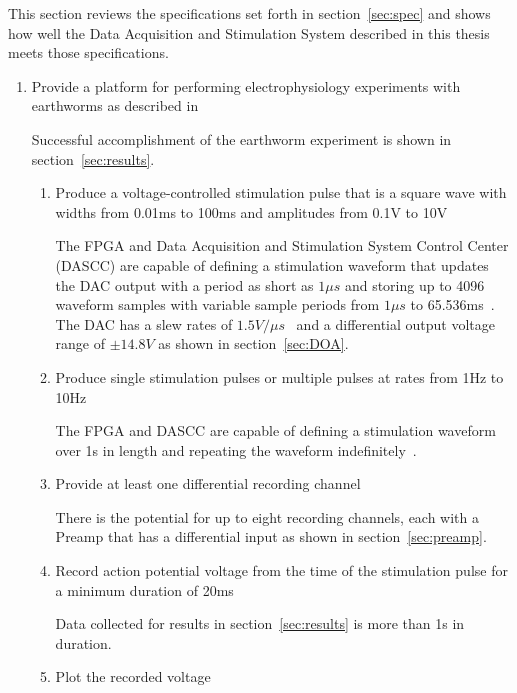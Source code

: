 This section reviews the specifications set forth in section~\ref{sec:spec} and shows how well the Data Acquisition and Stimulation System described in this thesis meets those specifications.

\begin{enumerate}

\item Provide a platform for performing electrophysiology experiments with earthworms as described in~\cite{Olivo,KuehJellies}

Successful accomplishment of the earthworm experiment is shown in section~\ref{sec:results}.

	\begin{enumerate}
	
	\item Produce a voltage-controlled stimulation pulse that is a square wave with widths from 0.01ms to 100ms and amplitudes from 0.1V to 10V
	
	The FPGA and Data Acquisition and Stimulation System Control Center (DASCC) are capable of defining a stimulation waveform that updates the DAC output with a period as short as $1\unit{\mu s}$ and storing up to 4096 waveform samples with variable sample periods from $1\unit{\mu s}$ to 65.536ms~\cite{BatzerMSEE}.  The DAC has a slew rates of $1.5\unit{V}/\unit{\mu s}$~\cite{AD5678ds} and a differential output voltage range of $\pm 14.8\unit{V}$ as shown in section~\ref{sec:DOA}.
	
	\item Produce single stimulation pulses or multiple pulses at rates from 1Hz to 10Hz
	
	The FPGA and DASCC are capable of defining a stimulation waveform over 1s in length and repeating the waveform indefinitely~\cite{BatzerMSEE}.
	
	\item Provide at least one differential recording channel
	
	There is the potential for up to eight recording channels, each with a Preamp that has a differential input as shown in section~\ref{sec:preamp}.
	
	\item Record action potential voltage from the time of the stimulation pulse for a minimum duration of 20ms
	
	Data collected for results in section~\ref{sec:results} is more than 1s in duration.
	
	\item Plot the recorded voltage
	

\end{enumerate}
\end{enumerate}
